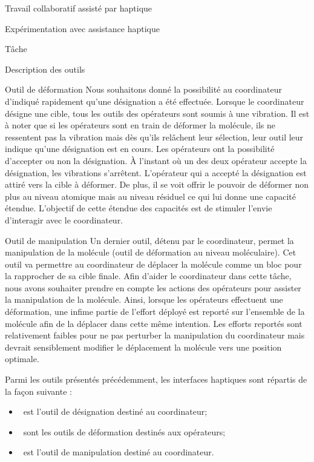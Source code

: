 \documentclass[myfrancais]{mythesis}
\begin{document}
\begin{mychapter}{Travail collaboratif assisté par haptique}
\begin{mysection}{Expérimentation avec assistance haptique}
\begin{mysubsection}{Tâche}
\begin{mysubsubsection}{Description des outils}
\begin{myparagraph}{Outil de déformation}
						Nous souhaitons donné la possibilité au coordinateur d'indiqué rapidement qu'une désignation a été effectuée.
						Lorsque le coordinateur désigne une cible, tous les outils des opérateurs sont soumis à une vibration.
						Il est à noter que si les opérateurs sont en train de déformer la molécule, ils ne ressentent pas la vibration mais dès qu'ils relâchent leur sélection, leur outil leur indique qu'une désignation est en cours.
						Les opérateurs ont la possibilité d'accepter ou non la désignation.
						À l'instant où un des deux opérateur accepte la désignation, les vibrations s'arrêtent.
						L'opérateur qui a accepté la désignation est attiré vers la cible à déformer.
						De plus, il se voit offrir le pouvoir de déformer non plus au niveau atomique mais au niveau résiduel ce qui lui donne une capacité étendue.
						L'objectif de cette étendue des capacités est de stimuler l'envie d'interagir avec le coordinateur.
					\end{myparagraph}
					\begin{myparagraph}{Outil de manipulation}
						Un dernier outil, détenu par le coordinateur, permet la manipulation de la molécule (outil de déformation au niveau moléculaire).
						Cet outil va permettre au coordinateur de déplacer la molécule comme un bloc pour la rapprocher de sa cible finale.
						Afin d'aider le coordinateur dans cette tâche, nous avons souhaiter prendre en compte les actions des opérateurs pour assister la manipulation de la molécule.
						Ainsi, lorsque les opérateurs effectuent une déformation, une infime partie de l'effort déployé est reporté sur l'ensemble de la molécule afin de la déplacer dans cette même intention.
						Les efforts reportés sont relativement faibles pour ne pas perturber la manipulation du coordinateur mais devrait sensiblement modifier le déplacement la molécule vers une position optimale.
					\end{myparagraph}

					Parmi les outils présentés précédemment, les interfaces haptiques sont répartis de la façon suivante :
					\begin{itemize}
						\item {}~\myOmni est l'outil de désignation destiné au coordinateur;
						\item {}~\myOmni sont les outils de déformation destinés aux opérateurs;
						\item {}~\myDesktop est l'outil de manipulation destiné au coordinateur.
					\end{itemize}


\end{mysubsubsection}
\end{mysubsection}
\end{mysection}
\end{mychapter}
\end{document}
